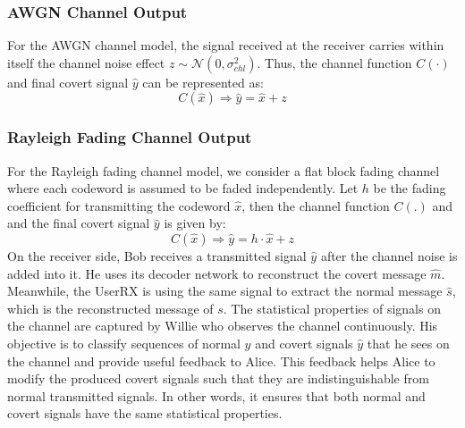 \subsubsection{AWGN Channel Output}
For the AWGN channel model, the signal received at the receiver carries within itself the channel noise effect \(z \sim \mathcal{N}(0, \sigma_{chl}^2)\). Thus, the channel function \(C(\cdot)\) and final covert signal \(\hat{y}\) can be represented as:
\begin{equation}
	C(\hat{x}) \Rightarrow \hat{y} = \hat{x} + z
\end{equation}

\subsubsection{Rayleigh Fading Channel Output}
For the Rayleigh fading channel model, we consider a flat block fading channel where each codeword is assumed to be faded independently. Let \(h\) be the fading coefficient for transmitting the codeword \(\hat{x}\), then the channel function \(C(.)\) and and the final covert signal \(\hat{y}\) is given by:
\begin{equation}
	C(\hat{x}) \Rightarrow \hat{y} = h \cdot \hat{x} + z
\end{equation}
On the receiver side, Bob receives a transmitted signal \(\hat{y}\) after the channel noise is added into it. He uses its decoder network to reconstruct the covert message \(\hat{m}\). Meanwhile, the UserRX is using the same signal to extract the normal message \(\hat{s}\), which is the reconstructed message of \(s\). The statistical properties of signals on the channel are captured by Willie who observes the channel continuously. His objective is to classify sequences of normal \(y\) and covert signals \(\hat{y}\) that he sees on the channel and provide useful feedback to Alice. This feedback helps Alice to modify the produced covert signals such that they are indistinguishable from normal transmitted signals. In other words, it ensures that both normal and covert signals have the same statistical properties.
